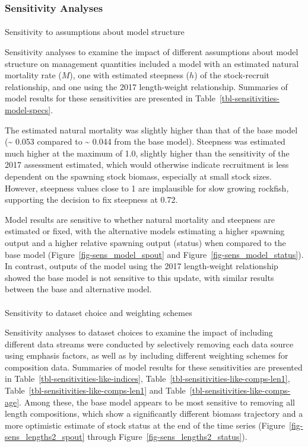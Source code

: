 \documentclass[
]{scrartcl}
\makeatletter
\let\oldparagraph\paragraph
\renewcommand{\paragraph}{
    \@ifstar
      \xxxParagraphStar
      \xxxParagraphNoStar
  }
\newcommand{\xxxParagraphStar}[1]{\oldparagraph*{#1}\mbox{}}
\newcommand{\xxxParagraphNoStar}[1]{\oldparagraph{#1}\mbox{}}
\makeatother
\begin{document}
\subsubsection{Sensitivity Analyses}\label{sensitivity-analyses}

\paragraph{Sensitivity to assumptions about model
structure}\label{sensitivity-to-assumptions-about-model-structure}

Sensitivity analyses to examine the impact of different assumptions
about model structure on management quantities included a model with an
estimated natural mortality rate (\(M\)), one with estimated steepness
(\(h\)) of the stock-recruit relationship, and one using the 2017
length-weight relationship. Summaries of model results for these
sensitivities are presented in
Table~\ref{tbl-sensitivities-model-specs}.

The estimated natural mortality was slightly higher than that of the
base model (\textasciitilde{} 0.053 compared to \textasciitilde{} 0.044
from the base model). Steepness was estimated much higher at the maximum
of 1.0, slightly higher than the sensitivity of the 2017 assessment
estimated, which would otherwise indicate recruitment is less dependent
on the spawning stock biomass, especially at small stock sizes. However,
steepness values close to 1 are implausible for slow growing rockfish,
supporting the decision to fix steepness at 0.72.

Model results are sensitive to whether natural mortality and steepness
are estimated or fixed, with the alternative models estimating a higher
spawning output and a higher relative spawning output (status) when
compared to the base model (Figure~\ref{fig-sens_model_spout} and
Figure~\ref{fig-sens_model_status}). In contrast, outputs of the model
using the 2017 length-weight relationship showed the base model is not
sensitive to this update, with similar results between the base and
alternative model.

\paragraph{Sensitivity to dataset choice and weighting
schemes}\label{sensitivity-to-dataset-choice-and-weighting-schemes}

Sensitivity analyses to dataset choices to examine the impact of
including different data streams were conducted by selectively removing
each data source using emphasis factors, as well as by including
different weighting schemes for composition data. Summaries of model
results for these sensitivities are presented in
Table~\ref{tbl-sensitivities-like-indices},
Table~\ref{tbl-sensitivities-like-comps-len1},
Table~\ref{tbl-sensitivities-like-comps-len1} and
Table~\ref{tbl-sensitivities-like-comps-age}. Among these, the base
model appears to be most sensitive to removing all length compositions,
which show a significantly different biomass trajectory and a more
optimistic estimate of stock status at the end of the time series
(Figure~\ref{fig-sens_lengths2_spout} through
Figure~\ref{fig-sens_lengths2_status}).
\end{document}
